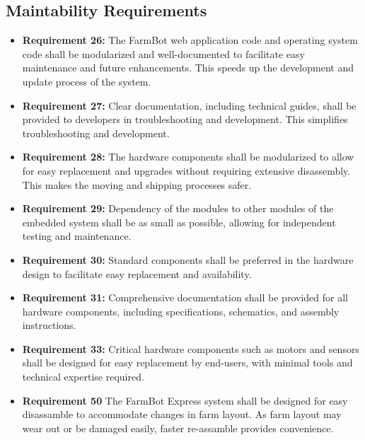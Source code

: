 \subsection{Maintability Requirements}
\begin{itemize}
	\item \textbf{Requirement 26:} The FarmBot web application code and operating system code shall be modularized and well-documented to facilitate easy maintenance and future enhancements. This speeds up the development and update process of the system.
	\item \textbf{Requirement 27:} Clear documentation, including technical guides, shall be provided to developers in troubleshooting and development. This simplifies troubleshooting and development.
	\item \textbf{Requirement 28:} The hardware components shall be modularized to allow for easy replacement and upgrades without requiring extensive disassembly. This makes the moving and shipping processes safer.
	\item \textbf{Requirement 29:} Dependency of the modules to other modules of the embedded system shall be as small as possible, allowing for independent testing and maintenance.
	\item \textbf{Requirement 30:} Standard components shall be preferred in the hardware design to facilitate easy replacement and availability.
	\item \textbf {Requirement 31:} Comprehensive documentation shall be provided for all hardware components, including specifications, schematics, and assembly instructions.
	\item \textbf{Requirement 33: } Critical hardware components such as motors and sensors shall be designed for easy replacement by end-users, with minimal tools and technical expertise required.
		\item \textbf{Requirement 50} The FarmBot Express system shall be designed for easy disassamble to accommodate changes in farm layout. As farm layout may wear out or be damaged easily, faster re-assamble provides convenience.
\end{itemize}

